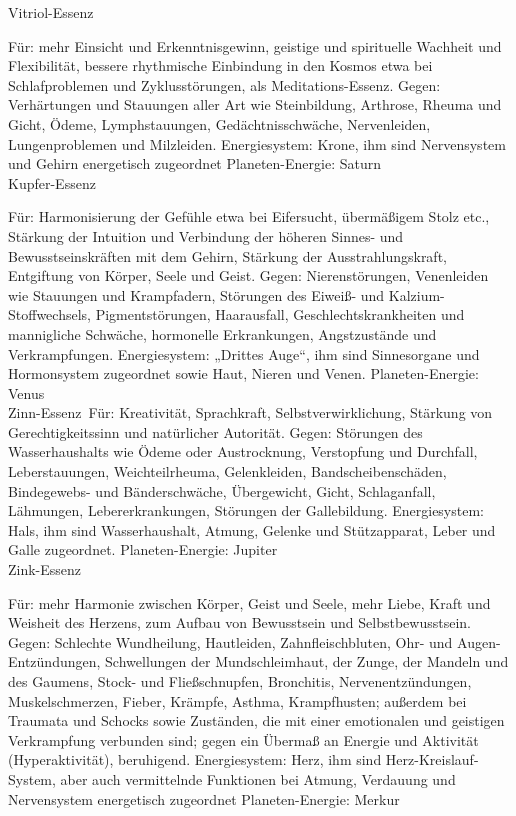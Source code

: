 \documentclass[a5paper,8pt]{book}
\begin{document}
\noindent Vitriol-Essenz\

Für: mehr Einsicht und Erkenntnisgewinn, geistige und spirituelle Wachheit und Flexibilität, bessere rhythmische Einbindung in den Kosmos etwa bei Schlafproblemen und 
Zyklusstörungen, als Meditations-Essenz. Gegen: Verhärtungen und Stauungen aller Art wie Steinbildung, Arthrose, Rheuma und Gicht, Ödeme, Lymphstauungen, Gedächtnisschwäche, 
Nervenleiden, Lungenproblemen und Milzleiden. Energiesystem: Krone, ihm sind Nervensystem und Gehirn energetisch zugeordnet
Planeten-Energie: Saturn\\

\noindent Kupfer-Essenz\

Für: Harmonisierung der Gefühle etwa bei Eifersucht, übermäßigem Stolz etc., Stärkung der Intuition und Verbindung der höheren Sinnes- und Bewusstseinskräften mit dem 
Gehirn, Stärkung der Ausstrahlungskraft, Entgiftung von Körper, Seele und Geist. Gegen: Nierenstörungen, Venenleiden wie Stauungen und Krampfadern, Störungen des Eiweiß- 
und Kalzium-Stoffwechsels, Pigmentstörungen, Haarausfall, Geschlechtskrankheiten und mannigliche Schwäche, hormonelle Erkrankungen, Angstzustände und Verkrampfungen. 
Energiesystem: „Drittes Auge“, ihm sind Sinnesorgane und Hormonsystem zugeordnet sowie Haut, Nieren und Venen. 
Planeten-Energie: Venus\\

\noindent Zinn-Essenz\
Für: Kreativität, Sprachkraft, Selbstverwirklichung, Stärkung von Gerechtigkeitssinn und natürlicher Autorität. Gegen: Störungen des Wasserhaushalts wie Ödeme oder 
Austrocknung, Verstopfung und Durchfall, Leberstauungen, Weichteilrheuma, Gelenkleiden, Bandscheibenschäden,
Bindegewebs- und Bänderschwäche, Übergewicht, Gicht, Schlaganfall, Lähmungen, Lebererkrankungen, Störungen der Gallebildung. Energiesystem:
Hals, ihm sind Wasserhaushalt, Atmung, Gelenke und Stützapparat, Leber und Galle zugeordnet. 
Planeten-Energie: Jupiter\\

\noindent Zink-Essenz\

Für: mehr Harmonie zwischen Körper, Geist und Seele, mehr Liebe, Kraft und Weisheit des Herzens, zum Aufbau von Bewusstsein und Selbstbewusstsein.
Gegen: Schlechte Wundheilung, Hautleiden, Zahnfleischbluten, Ohr- und Augen-Entzündungen, Schwellungen der Mundschleimhaut, der Zunge, der Mandeln und des Gaumens, Stock- 
und Fließschnupfen, Bronchitis, Nervenentzündungen, Muskelschmerzen, Fieber, Krämpfe, Asthma, Krampfhusten; außerdem bei Traumata und Schocks sowie Zuständen, die mit einer 
emotionalen und geistigen Verkrampfung verbunden sind; gegen ein Übermaß an Energie und Aktivität (Hyperaktivität), beruhigend. Energiesystem: Herz, ihm sind 
Herz-Kreislauf-System, aber auch vermittelnde Funktionen bei Atmung, Verdauung und Nervensystem energetisch zugeordnet
Planeten-Energie: Merkur\\
\end{document}
